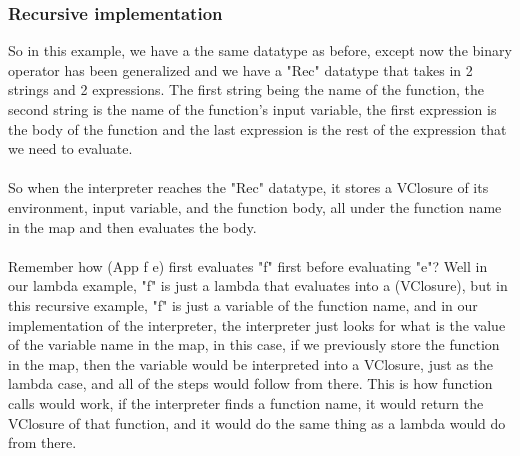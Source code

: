 \documentclass[12pt]{article}
\begin{document}
\subsubsection{Recursive implementation}

So in this example, we have a the same datatype as before, except now the binary operator has been generalized and we have a "Rec" datatype that takes in 2 strings and 2 expressions. The first string being the name of the function, the second string is the name of the function's input variable, the first expression is the body of the function and the last expression is the rest of the expression that we need to evaluate.\\
\\
So when the interpreter reaches the "Rec" datatype, it stores a VClosure of its environment, input variable, and the function body, all under the function name in the map and then evaluates the body.\\
\\
Remember how (App f e) first evaluates "f" first before evaluating "e"? Well in our lambda example, "f" is just a lambda that evaluates into a (VClosure), but in this recursive example, "f" is just a variable of the function name, and in our implementation of the interpreter, the interpreter just looks for what is the value of the variable name in the map, in this case, if we previously store the function in the map, then the variable would be interpreted into a VClosure, just as the lambda case, and all of the steps would follow from there. This is how function calls would work, if the interpreter finds a function name, it would return the VClosure of that function, and it would do the same thing as a lambda would do from there.
\end{document}
